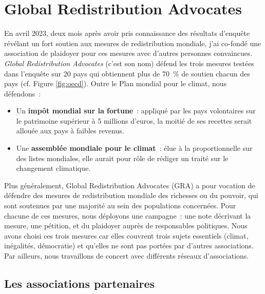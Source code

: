 \documentclass[a5paper,french,openany]{memoir}
\begin{document}
\section{Global Redistribution Advocates}

En avril 2023, deux mois après avoir pris connaissance des résultats d'enquête révélant un fort soutien aux mesures de redistribution mondiale, j'ai co-fondé une association de plaidoyer pour ces mesures avec d'autres personnes convaincues. \textit{Global Redistribution Advocates} (c'est son nom) défend les trois mesures testées dans l'enquête sur 20 pays qui obtiennent plus de 70~\% de soutien chacun des pays (cf. Figure \ref{fig:oecd}). Outre le Plan mondial pour le climat, nous défendons~: 
\begin{itemize}
  \item Un \textbf{impôt mondial sur la fortune}~: appliqué par les pays volontaires sur le patrimoine supérieur à 5 millions d'euros, la moitié de ses recettes serait allouée aux pays à faibles revenus.
  \item Une \textbf{assemblée mondiale pour le climat}~: élue à la proportionnelle sur des listes mondiales, elle aurait pour rôle de rédiger un traité sur le changement climatique.
\end{itemize}

Plus généralement, Global Redistribution Advocates (GRA) a pour vocation de défendre des mesures de redistribution mondiale des richesses ou du pouvoir, qui sont soutenues par une majorité au sein des populations concernées. Pour chacune de ces mesures, nous déployons une campagne~: une note décrivant la mesure, une pétition, et du plaidoyer auprès de responsables politiques. Nous avons choisi ces trois mesures car elles couvrent trois sujets essentiels (climat, inégalités, démocratie) et qu'elles ne sont pas portées par d'autres associations. Par ailleurs, nous travaillons de concert avec différents réseaux d'associations. 

\subsection{Les associations partenaires}
\end{document}

